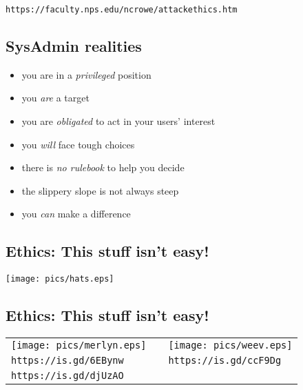 \documentclass[xga]{xdvislides}
\begin{document}
\vspace{1in}

{\tt https://faculty.nps.edu/ncrowe/attackethics.htm}

\subsection{SysAdmin realities}
\begin{itemize}
	\item you are in a {\em privileged} position
	\item you {\em are} a target
	\item you are {\em obligated} to act in your users' interest
	\item you {\em will} face tough choices
	\item there is {\em no rulebook} to help you decide
	\item the slippery slope is not always steep
	\item you {\em can} make a difference
\end{itemize}

\subsection{Ethics: This stuff isn't easy!}

\vspace{.5in}
\begin{center}
       \texttt{[image: pics/hats.eps]} \\
	\small
	\Normalsize
\end{center}

\subsection{Ethics: This stuff isn't easy!}
\vspace*{\fill}
\begin{center}
\begin{tabular}{ l c l }
\texttt{[image: pics/merlyn.eps]} &
\hspace{.5in} &
\texttt{[image: pics/weev.eps]} \\
{\tt https://is.gd/6EBynw} &  \hspace{.5in} & {\tt https://is.gd/ccF9Dg}\\
{\tt https://is.gd/djUzAO} \\
\end{tabular}
\end{center}
\vspace*{\fill}
\Normalsize
\end{document}
